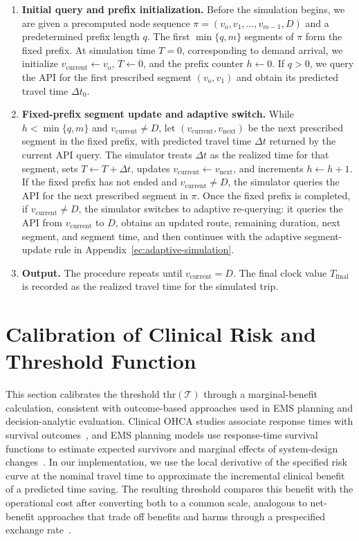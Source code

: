 \documentclass[11pt, letterpaper, oneside, reqno]{amsart}
\begin{document}
\begin{enumerate}[leftmargin=7mm]
\item \textbf{Initial query and prefix initialization.}
Before the simulation begins, we are given a precomputed node sequence $\pi=(v_{\mathrm{o}},v_1,\ldots,v_{m-1},D)$ and a predetermined prefix length $q$. The first $\min\{q,m\}$ segments of $\pi$ form the fixed prefix. At simulation time $T=0$, corresponding to demand arrival, we initialize $v_{\mathrm{current}}\leftarrow v_{\mathrm{o}}$, $T\leftarrow 0$, and the prefix counter $h\leftarrow 0$. If $q>0$, we query the API for the first prescribed segment $(v_{\mathrm{o}},v_1)$ and obtain its predicted travel time $\Delta t_0$.

\item \textbf{Fixed-prefix segment update and adaptive switch.}
While $h<\min\{q,m\}$ and $v_{\mathrm{current}}\neq D$, let $(v_{\mathrm{current}},v_{\mathrm{next}})$ be the next prescribed segment in the fixed prefix, with predicted travel time $\Delta t$ returned by the current API query. The simulator treats $\Delta t$ as the realized time for that segment, sets $T\leftarrow T+\Delta t$, updates $v_{\mathrm{current}}\leftarrow v_{\mathrm{next}}$, and increments $h\leftarrow h+1$. If the fixed prefix has not ended and $v_{\mathrm{current}}\neq D$, the simulator queries the API for the next prescribed segment in $\pi$. Once the fixed prefix is completed, if $v_{\mathrm{current}}\neq D$, the simulator switches to adaptive re-querying: it queries the API from $v_{\mathrm{current}}$ to $D$, obtains an updated route, remaining duration, next segment, and segment time, and then continues with the adaptive segment-update rule in Appendix~\ref{ec:adaptive-simulation}.

\item \textbf{Output.}
The procedure repeats until $v_{\mathrm{current}}=D$. The final clock value $T_{\mathrm{final}}$ is recorded as the realized travel time for the simulated trip.
\end{enumerate}


\section{Calibration of Clinical Risk and Threshold Function} \label{ec:calibration}
This section calibrates the threshold $\mathrm{thr}(\mathcal T)$ through a marginal-benefit calculation, consistent with outcome-based approaches used in EMS planning and decision-analytic evaluation. Clinical OHCA studies associate response times with survival outcomes~\cite{ref:chen2022alsresponse}, and EMS planning models use response-time survival functions to estimate expected survivors and marginal effects of system-design changes~\cite{ref:sund2013analytical,ref:erkut2008ambulance}. In our implementation, we use the local derivative of the specified risk curve at the nominal travel time to approximate the incremental clinical benefit of a predicted time saving. The resulting threshold compares this benefit with the operational cost after converting both to a common scale, analogous to net-benefit approaches that trade off benefits and harms through a prespecified exchange rate~\cite{ref:vickers2016net}.
\end{document}
